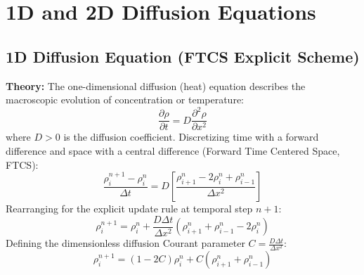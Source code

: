 \documentclass{article}
\begin{document}
\section{1D and 2D Diffusion Equations}

\subsection{1D Diffusion Equation (FTCS Explicit Scheme)}
\textbf{Theory:} The one-dimensional diffusion (heat) equation describes the macroscopic evolution of concentration or temperature:
$$\frac{\partial \rho}{\partial t} = D \frac{\partial^2 \rho}{\partial x^2}$$
where $D > 0$ is the diffusion coefficient. Discretizing time with a forward difference and space with a central difference (Forward Time Centered Space, FTCS):
$$\frac{\rho_i^{n+1} - \rho_i^n}{\Delta t} = D \left[ \frac{\rho_{i+1}^n - 2\rho_i^n + \rho_{i-1}^n}{\Delta x^2} \right]$$
Rearranging for the explicit update rule at temporal step $n+1$:
$$\rho_i^{n+1} = \rho_i^n + \frac{D \Delta t}{\Delta x^2} \left( \rho_{i+1}^n + \rho_{i-1}^n - 2\rho_i^n \right)$$
Defining the dimensionless diffusion Courant parameter $C = \frac{D \Delta t}{\Delta x^2}$:
$$\rho_i^{n+1} = (1 - 2C)\rho_i^n + C(\rho_{i+1}^n + \rho_{i-1}^n)$$
\end{document}
